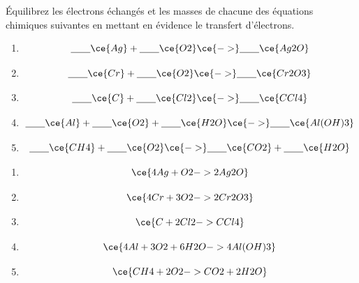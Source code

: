\documentclass[
  11pt,
  a4paper,
  openany]{book}
\providecommand{\tightlist}{%
  \setlength{\itemsep}{0pt}\setlength{\parskip}{0pt}}
\begin{document}
\begin{Exercise}

Équilibrez les électrons échangés et les masses de chacune des équations chimiques suivantes en mettant en évidence le transfert d'électrons.

\begin{enumerate}
\def\labelenumi{\alph{enumi}.}
\tightlist
\item
  \[
  \underline{\hspace{2em}} \ce{Ag} + \underline{\hspace{2em}} \ce{O2} \ce{->} \underline{\hspace{2em}} \ce{Ag2O}
  \]
  \vspace{1em}
\item
  \[
  \underline{\hspace{2em}} \ce{Cr} + \underline{\hspace{2em}} \ce{O2} \ce{->} \underline{\hspace{2em}} \ce{Cr2O3}
  \]
  \vspace{1em}
\item
  \[
  \underline{\hspace{2em}} \ce{C} + \underline{\hspace{2em}} \ce{Cl2} \ce{->} \underline{\hspace{2em}} \ce{CCl4}
  \]
  \vspace{1em}
\item
  \[
  \underline{\hspace{2em}} \ce{Al} + \underline{\hspace{2em}} \ce{O2} + \underline{\hspace{2em}} \ce{H2O} \ce{->} \underline{\hspace{2em}} \ce{Al(OH)3}
  \]
  \vspace{1em}
\item
  \[
  \underline{\hspace{2em}} \ce{CH4} + \underline{\hspace{2em}} \ce{O2} \ce{->} \underline{\hspace{2em}} \ce{CO2} + \underline{\hspace{2em}} \ce{H2O}
  \]
  \vspace{1em}
\end{enumerate}

\end{Exercise}

\begin{Answer}

\begin{enumerate}
\def\labelenumi{\alph{enumi}.}
\tightlist
\item
  \[
  \ce{4Ag + O2 -> 2Ag2O}
  \]
\item
  \[
  \ce{4Cr + 3O2 -> 2Cr2O3}
  \]
\item
  \[
  \ce{C + 2Cl2 -> CCl4}
  \]
\item
  \[
  \ce{4Al + 3O2 + 6H2O -> 4 Al(OH)3}
  \]
\item
  \[
  \ce{CH4 + 2O2 -> CO2 + 2H2O}
  \]
\end{enumerate}

\end{Answer}
\end{document}
